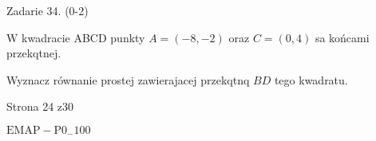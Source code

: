 \documentclass[a4paper,12pt]{article}
\begin{document}
Zadarie 34. (0-2)

$\mathrm{W}$ kwadracie ABCD punkty $A=(-8,-2)$ oraz $C=(0,4)$ sa końcami przekqtnej.

Wyznacz równanie prostej zawierajacej przekqtnq $BD$ tego kwadratu.

Strona 24 z30

$\mathrm{E}\mathrm{M}\mathrm{A}\mathrm{P}-\mathrm{P}0_{-}100$
\end{document}
